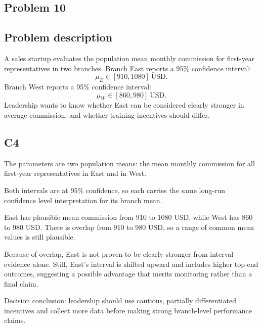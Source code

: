 \begin{ExamProblems}
		\subsection*{Problem 10}
		\subsection*{Problem description}
		A sales startup evaluates the population mean monthly commission for first-year representatives in two branches.
		Branch East reports a 95\% confidence interval:
		\[
		\mu_E \in [910, 1080]\ \text{USD}.
		\]
		Branch West reports a 95\% confidence interval:
		\[
		\mu_W \in [860, 980]\ \text{USD}.
		\]
		Leadership wants to know whether East can be considered clearly stronger in average commission, and whether training incentives should differ.

		\subsection*{C4}
		The parameters are two population means: the mean monthly commission for all first-year representatives in East and in West.

		Both intervals are at 95\% confidence, so each carries the same long-run confidence level interpretation for its branch mean.

		East has plausible mean commission from 910 to 1080 USD, while West has 860 to 980 USD.
		There is overlap from 910 to 980 USD, so a range of common mean values is still plausible.

		Because of overlap, East is not proven to be clearly stronger from interval evidence alone.
		Still, East's interval is shifted upward and includes higher top-end outcomes, suggesting a possible advantage that merits monitoring rather than a final claim.

		Decision conclusion: leadership should use cautious, partially differentiated incentives and collect more data before making strong branch-level performance claims.

	\end{ExamProblems}

